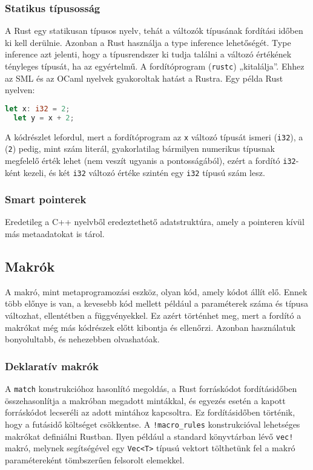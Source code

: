 \subsubsection{Statikus típusosság}
A Rust egy statikusan típusos nyelv, tehát a változók típusának fordítási időben ki kell derülnie. Azonban a Rust használja a type inference lehetőségét. Type inference azt jelenti, hogy a típusrendszer ki tudja találni a változó értékének tényleges típusát, ha az egyértelmű. A fordítóprogram (\lstinline{rustc}) „kitalálja”. Ehhez az SML és az OCaml nyelvek gyakoroltak hatást a Rustra. Egy példa Rust nyelven:
\begin{lstlisting}[language=Rust, style=boxed]
  let x: i32 = 2;
  let y = x + 2;
\end{lstlisting}
A kódrészlet lefordul, mert a fordítóprogram az \lstinline{x} változó típusát ismeri (\lstinline{i32}), a (\lstinline{2}) pedig, mint szám literál, gyakorlatilag bármilyen numerikus típusnak megfelelő érték lehet (nem veszít ugyanis a pontosságából), ezért a fordító \lstinline{i32}-ként kezeli, és két \lstinline{i32} változó értéke szintén egy \lstinline{i32} típusú szám lesz.

\subsubsection{Smart pointerek}
Eredetileg a C++ nyelvből eredeztethető adatstruktúra, amely a pointeren kívül más metaadatokat is tárol.

\subsection{Makrók}
A makró, mint metaprogramozási eszköz, olyan kód, amely kódot állít elő. Ennek több előnye is van, a kevesebb kód mellett például a paraméterek száma és típusa változhat, ellentétben a függvényekkel. Ez azért történhet meg, mert a fordító a makrókat még más kódrészek előtt kibontja és ellenőrzi. Azonban használatuk bonyolultabb, és nehezebben olvashatóak.

\subsubsection{Deklaratív makrók}
A \lstinline{match} konstrukcióhoz hasonlító megoldás, a Rust forráskódot fordításidőben összehasonlítja a makróban megadott mintákkal, és egyezés esetén a kapott forráskódot lecseréli az adott mintához kapcsoltra. Ez fordításidőben történik, hogy a futásidő költséget csökkentse. A \lstinline{!macro_rules} konstrukcióval lehetséges makrókat definiálni Rustban. Ilyen például a standard könyvtárban lévő \lstinline{vec!} makró, melynek segítségével egy \lstinline{Vec<T>} típusú vektort tölthetünk fel a makró paramétereként tömbszerűen felsorolt elemekkel.

